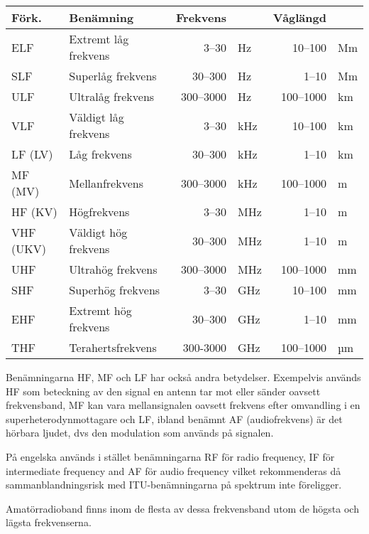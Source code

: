 \begin{tabular}{llrlrl}
	\textbf{Förk.} & \textbf{Benämning}   & \textbf{Frekvens} &     & \textbf{Våglängd} &  \\ \hline
	ELF            & Extremt låg frekvens &             3--30 & Hz  &           10--100 & Mm \\
	SLF            & Superlåg frekvens    &           30--300 & Hz  &             1--10 & Mm \\
	ULF            & Ultralåg frekvens    &         300--3000 & Hz  &         100--1000 & km \\
	VLF            & Väldigt låg frekvens &             3--30 & kHz &           10--100 & km \\
	LF (LV)        & Låg frekvens         &           30--300 & kHz &             1--10 & km \\
	MF (MV)        & Mellanfrekvens       &         300--3000 & kHz &         100--1000 & m  \\
	HF (KV)        & Högfrekvens          &             3--30 & MHz &             1--10 & m  \\
	VHF (UKV)      & Väldigt hög frekvens &           30--300 & MHz &             1--10 & m  \\
	UHF            & Ultrahög frekvens    &         300--3000 & MHz &         100--1000 & mm \\
	SHF            & Superhög frekvens    &             3--30 & GHz &           10--100 & mm \\
	EHF            & Extremt hög frekvens &           30--300 & GHz &             1--10 & mm \\
	THF            & Terahertsfrekvens    &          300-3000 & GHz &         100--1000 & µm
\end{tabular}

Benämningarna HF, MF och LF har också andra betydelser. Exempelvis an\-vänd\-s HF som beteckning av den signal en antenn tar mot eller sänder oavsett frekvensband, MF kan vara mellansignalen oavsett frekvens efter omvandling i en superheterodynmottagare och LF, ibland benämnt AF (audiofrekvens) är det hörbara ljudet, dvs den modulation som används på signalen.

På engelska används i stället benämningarna RF för radio frequency, IF för intermediate frequency and AF för audio frequency vilket rekommenderas då sammanblandningsrisk med ITU-benämningarna på spektrum inte föreligger.

Amatörradioband finns inom de flesta av dessa frekvensband utom de högsta och lägsta frekvenserna.

